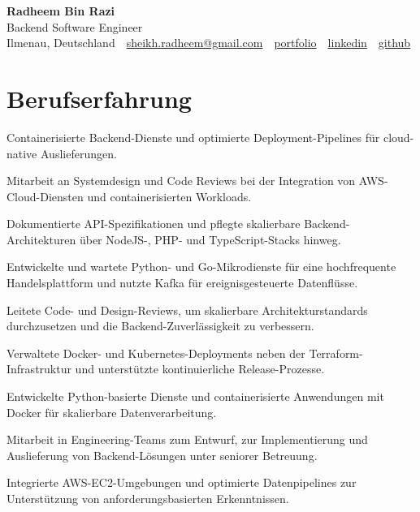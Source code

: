 \documentclass[11pt,a4paper]{resume}
\makeatletter
\newcommand{\Portfolio}{https://radheem.github.io/my-cv}
\newcommand{\PortfolioText}{portfolio}
\newcommand{\GitHub}{https://github.com/radheem}
\newcommand{\LinkedIn}{https://www.linkedin.com/in/radheem-razi}
\newcommand{\Email}{sheikh.radheem@gmail.com}
\makeatother
\begin{document}
\clearpage
{}

\begin{center}
  {\huge\bfseries Radheem Bin Razi}\\[3pt]
  {\large Backend Software Engineer}\\[6pt]
  \small
  Ilmenau, Deutschland \,\textbar\,
  \href{mailto:\Email}{\Email} \,\textbar\,
  \href{\Portfolio}{\PortfolioText} \,\textbar\,
  \href{\LinkedIn}{linkedin} \,\textbar\,
  \href{\GitHub}{github}
\end{center}
\vspace{2pt}

\section{Berufserfahrung}

\bullets
  \item Containerisierte Backend-Dienste und optimierte Deployment-Pipelines für cloud-native Auslieferungen.
  \item Mitarbeit an Systemdesign und Code Reviews bei der Integration von AWS-Cloud-Diensten und containerisierten Workloads.
  \item Dokumentierte API-Spezifikationen und pflegte skalierbare Backend-Architekturen über NodeJS-, PHP- und TypeScript-Stacks hinweg.
\bulletsend
\vspace{3pt}
\bullets
  \item Entwickelte und wartete Python- und Go-Mikrodienste für eine hochfrequente Handelsplattform und nutzte Kafka für ereignisgesteuerte Datenflüsse.
  \item Leitete Code- und Design-Reviews, um skalierbare Architekturstandards durchzusetzen und die Backend-Zuverlässigkeit zu verbessern.
  \item Verwaltete Docker- und Kubernetes-Deployments neben der Terraform-Infrastruktur und unterstützte kontinuierliche Release-Prozesse.
\bulletsend
\vspace{3pt}
\bullets
  \item Entwickelte Python-basierte Dienste und containerisierte Anwendungen mit Docker für skalierbare Datenverarbeitung.
  \item Mitarbeit in Engineering-Teams zum Entwurf, zur Implementierung und Auslieferung von Backend-Lösungen unter seniorer Betreuung.
  \item Integrierte AWS-EC2-Umgebungen und optimierte Datenpipelines zur Unterstützung von anforderungsbasierten Erkenntnissen.
\bulletsend
\vspace{3pt}
\end{document}
